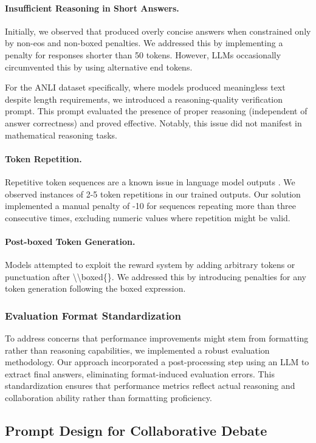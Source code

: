 \paragraph{Insufficient Reasoning in Short Answers.} Initially, we observed that \oursspace produced overly concise answers when constrained only by non-eos and non-boxed penalties. We addressed this by implementing a penalty for responses shorter than 50 tokens. However, LLMs occasionally circumvented this by using alternative end tokens. 

For the ANLI dataset specifically, where models produced meaningless text despite length requirements, we introduced a reasoning-quality verification prompt. This prompt evaluated the presence of proper reasoning (independent of answer correctness) and proved effective. Notably, this issue did not manifest in mathematical reasoning tasks.
\paragraph{Token Repetition.} Repetitive token sequences are a known issue in language model outputs \citep{holtzman2019curious}. We observed instances of 2-5 token repetitions in our trained outputs. Our solution implemented a manual penalty of -10 for sequences repeating more than three consecutive times, excluding numeric values where repetition might be valid.
\paragraph{Post-boxed Token Generation.} Models attempted to exploit the reward system by adding arbitrary tokens or punctuation after \textbackslash\textbackslash boxed\{\}. We addressed this by introducing penalties for any token generation following the boxed expression.
\subsubsection{Evaluation Format Standardization}
To address concerns that performance improvements might stem from formatting rather than reasoning capabilities, we implemented a robust evaluation methodology. Our approach incorporated a post-processing step using an LLM to extract final answers, eliminating format-induced evaluation errors. This standardization ensures that performance metrics reflect actual reasoning and collaboration ability rather than formatting proficiency.


\subsection{Prompt Design for Collaborative Debate}
